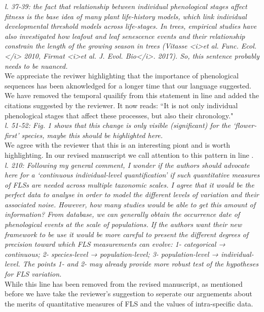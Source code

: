 \documentclass{article}[11pt]
\begin{document}
{{\emph{l. 37-39: the fact that relationship between individual phenological stages affect fitness is the base idea of many plant life-history models, which link individual developmental threshold models across life-stages. In trees, empirical studies have also investigated how leafout and leaf senescence events and their relationship constrain the length of the growing season in trees (Vitasse <i>et al. Func. Ecol.</i> 2010, Firmat <i>et al. J. Evol. Bio</i>. 2017). So, this sentence probably needs to be nuanced.}\\

\noindent We appreciate the reviwer highlighting that the importance of phenological sequences has been aknowledged for a longer time that our language suggested. We have removed the temporal quailify from this statement in line  and added the citations suggested by the reviewer. It now reads: ``It is not only individual phenological stages that affect these processes, but also their chronology."\\

\emph{l. 51-52: Fig. 1 shows that this change is only visible (significant) for the ‘flower-first’ species, maybe this should be highlighted here.}\\

\noident We agree with the reviewer that this is an interesting piont and is worth highlighting. In our revised manuscript we call attention to this pattern in line .\\

\emph{l. 210: Following my general comment, I wonder if the authors should advocate here for a ‘continuous individual-level quantification’ if such quantitative measures of FLSs are needed across multiple taxonomic scales. I agree that it would be the perfect data to analyse in order to model the different levels of variation and their associated noise. However, how many studies would be able to get this amount of information? From database, we can generally obtain the occurrence date of phenological events at the scale of populations. If the authors want their new framework to be use it would be more careful to present the different degrees of precision toward which FLS measurements can evolve: 1- categorical → continuous; 2- species-level → population-level; 3- population-level → individual-level. The points 1- and 2- may already provide more robust test of the hypotheses for FLS variation.}\\

\noindent While this line has been removed from the revised manuscript, as mentioned before we have take the reviewer's suggestion to seperate our arguements about the merits of quantitative measures of FLS and the values of intra-specific data.\\


}}
\end{document}
